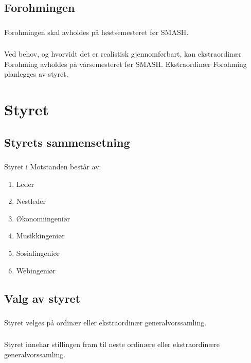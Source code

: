 \documentclass{article}
\newenvironment{statute}[1][]
    {
        \titleformat{\subsubsection}[runin]{\normalfont}{\hspace{1pt}\textit{\S\hspace{5pt}\thesubsubsection}}{0pt}{\rule{4pt}{0pt}}{}
        \subsubsection{}#1
        \begin{minipage}[t]{0.9\linewidth}
    }
    {
        \end{minipage}
        
        \ignorespacesafterend
    }
\begin{document}
        \subsection{Forohmingen}     
             \begin{statute}
                Forohmingen skal avholdes på høstsemesteret før SMASH.
            \end{statute}
             \begin{statute}
                Ved behov, og hvorvidt det er realistisk gjennomførbart, kan ekstraordinær Forohming avholdes på vårsemesteret før SMASH. Ekstraordinær Forohming planlegges av styret.
             \end{statute}
             
    \section{Styret}
        \subsection{Styrets sammensetning}
            \begin{statute}
                Styret i Motstanden består av:
                \begin{enumerate}[font = \bfseries]
                    \item Leder
                    \item Nestleder
                    \item Økonomiingeniør
                    \item Musikkingeniør
                    \item Sosialingeniør
                    \item Webingeniør
                \end{enumerate}
            \end{statute}

        \subsection{Valg av styret}
            \begin{statute}
                Styret velges på ordinær eller ekstraordinær generalvorssamling.
            \end{statute}
            \begin{statute}
                Styret innehar stillingen fram til neste ordinære eller ekstraordinære generalvorssamling.
            \end{statute}
            
\end{document}
